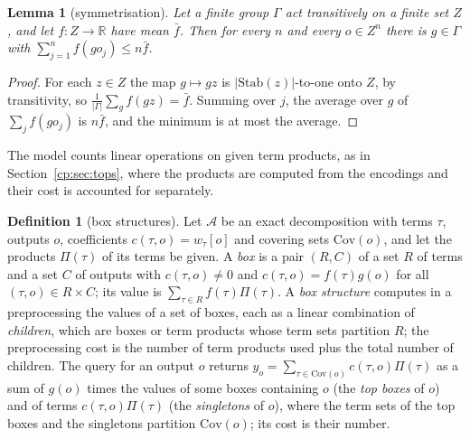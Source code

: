 \documentclass[11pt]{article}
\newtheorem{lemma}[theorem]{Lemma}
\theoremstyle{definition}
\newtheorem{definition}[theorem]{Definition}
\theoremstyle{remark}
\providecommand{\R}{\mathbb{R}}
\newcommand{\abs}[1]{\lvert #1\rvert}
\newcommand{\Cov}{\mathrm{Cov}}               %
\begin{document}
\begin{lemma}[symmetrisation]\label{cp:F22}
Let a finite group $\Gamma$ act transitively on a finite set $Z$, and let $f:Z\to\R$ have mean $\bar f$. Then for every $n$ and every $o\in Z^n$ there is $g\in\Gamma$ with $\sum_{j=1}^nf(go_j)\le n\bar f$.
\end{lemma}

\begin{proof}
For each $z\in Z$ the map $g\mapsto gz$ is $\abs{\mathrm{Stab}(z)}$-to-one onto $Z$, by transitivity, so $\frac1{\abs\Gamma}\sum_gf(gz)=\bar f$. Summing over $j$, the average over $g$ of $\sum_jf(go_j)$ is $n\bar f$, and the minimum is at most the average.
\end{proof}

The model counts linear operations on given term products, as in Section~\ref{cp:sec:tops}, where the products are computed from the encodings and their cost is accounted for separately.

\begin{definition}[box structures]\label{cp:F6:model}
Let $\mathcal A$ be an exact decomposition with terms $\tau$, outputs $o$, coefficients $c(\tau,o)=w_\tau[o]$ and covering sets $\Cov(o)$, and let the products $\Pi(\tau)$ of its terms be given. A \emph{box} is a pair $(R,C)$ of a set $R$ of terms and a set $C$ of outputs with $c(\tau,o)\ne0$ and $c(\tau,o)=f(\tau)g(o)$ for all $(\tau,o)\in R\times C$; its value is $\sum_{\tau\in R}f(\tau)\Pi(\tau)$. A \emph{box structure} computes in a preprocessing the values of a set of boxes, each as a linear combination of \emph{children}, which are boxes or term products whose term sets partition $R$; the preprocessing cost is the number of term products used plus the total number of children. The query for an output $o$ returns $y_o=\sum_{\tau\in\Cov(o)}c(\tau,o)\Pi(\tau)$ as a sum of $g(o)$ times the values of some boxes containing $o$ (the \emph{top boxes} of $o$) and of terms $c(\tau,o)\Pi(\tau)$ (the \emph{singletons} of $o$), where the term sets of the top boxes and the singletons partition $\Cov(o)$; its cost is their number.
\end{definition}
\end{document}
